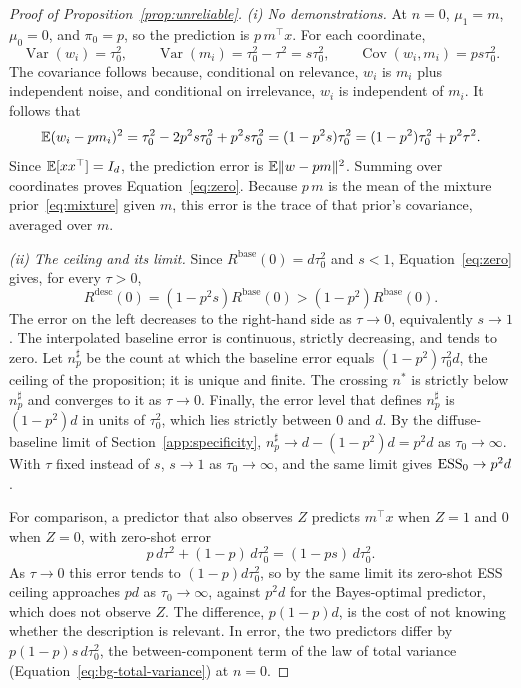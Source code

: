 \begin{proof}[Proof of Proposition~\ref{prop:unreliable}]
\emph{(i) No demonstrations.}
At $n=0$, $\mu_1=m$, $\mu_0=0$, and $\pi_0=p$, so the prediction is $p\,m^\top x$. For each coordinate,
\[
\operatorname{Var}(w_i)=\tau_0^2,\qquad
\operatorname{Var}(m_i)=\tau_0^2-\tau^2=s\tau_0^2,\qquad
\operatorname{Cov}(w_i,m_i)=ps\tau_0^2.
\]
The covariance follows because, conditional on relevance, $w_i$ is $m_i$ plus independent noise, and conditional on irrelevance, $w_i$ is independent of $m_i$. It follows that
\[
\mathbb{E}(w_i-pm_i)^2
=\tau_0^2-2p^2s\tau_0^2+p^2s\tau_0^2
=(1-p^2s)\tau_0^2
=(1-p^2)\tau_0^2+p^2\tau^2.
\]
Since $\mathbb{E}[xx^\top]=I_d$, the prediction error is $\mathbb{E}\|w-pm\|^2$. Summing over coordinates proves Equation~\eqref{eq:zero}. Because $p\,m$ is the mean of the mixture prior~\eqref{eq:mixture} given $m$, this error is the trace of that prior's covariance, averaged over $m$.

\emph{(ii) The ceiling and its limit.}
Since $R^{\mathrm{base}}(0)=d\tau_0^2$ and $s<1$, Equation~\eqref{eq:zero} gives, for every $\tau>0$,
\[
R^{\mathrm{desc}}(0)
=(1-p^2s)R^{\mathrm{base}}(0)
>(1-p^2)R^{\mathrm{base}}(0).
\]
The error on the left decreases to the right-hand side as $\tau\to0$, equivalently $s\to1$. The interpolated baseline error is continuous, strictly decreasing, and tends to zero. Let $n_p^{\sharp}$ be the count at which the baseline error equals $(1-p^2)\tau_0^2d$, the ceiling of the proposition; it is unique and finite. The crossing $n^*$ is strictly below $n_p^{\sharp}$ and converges to it as $\tau\to0$. Finally, the error level that defines $n_p^{\sharp}$ is $(1-p^2)d$ in units of $\tau_0^2$, which lies strictly between $0$ and $d$. By the diffuse-baseline limit of Section~\ref{app:specificity}, $n_p^{\sharp}\to d-(1-p^2)d=p^2d$ as $\tau_0\to\infty$. With $\tau$ fixed instead of $s$, $s\to1$ as $\tau_0\to\infty$, and the same limit gives $\mathrm{ESS}_0\to p^2d$.

For comparison, a predictor that also observes $Z$ predicts $m^\top x$ when $Z=1$ and $0$ when $Z=0$, with zero-shot error
\[
p\,d\tau^2+(1-p)\,d\tau_0^2=(1-ps)\,d\tau_0^2.
\]
As $\tau\to0$ this error tends to $(1-p)d\tau_0^2$, so by the same limit its zero-shot ESS ceiling approaches $pd$ as $\tau_0\to\infty$, against $p^2d$ for the Bayes-optimal predictor, which does not observe $Z$. The difference, $p(1-p)d$, is the cost of not knowing whether the description is relevant. In error, the two predictors differ by $p(1-p)s\,d\tau_0^2$, the between-component term of the law of total variance (Equation~\eqref{eq:bg-total-variance}) at $n=0$.


\end{proof}

